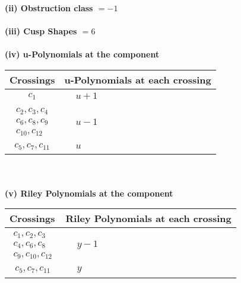 \documentclass[1p]{elsarticle_modified}
\theoremstyle{definition}
\begin{document}
\flushleft \textbf{(ii) Obstruction class $= -1$}\\~\\
\flushleft \textbf{(iii) Cusp Shapes $= 6$}\\~\\
\newpage\renewcommand{\arraystretch}{1}
\flushleft \textbf{(iv) u-Polynomials at the component}\newline \\
\begin{tabular}{m{50pt}|m{274pt}}
Crossings & \hspace{64pt}u-Polynomials at each crossing \\
\hline $$\begin{aligned}c_{1}\end{aligned}$$&$\begin{aligned}
&u+1
\end{aligned}$\\
\hline $$\begin{aligned}c_{2},c_{3},c_{4}\\c_{6},c_{8},c_{9}\\c_{10},c_{12}\end{aligned}$$&$\begin{aligned}
&u-1
\end{aligned}$\\
\hline $$\begin{aligned}c_{5},c_{7},c_{11}\end{aligned}$$&$\begin{aligned}
&u
\end{aligned}$\\
\hline
\end{tabular}\\~\\
\newpage\renewcommand{\arraystretch}{1}
\flushleft \textbf{(v) Riley Polynomials at the component}\newline \\
\begin{tabular}{m{50pt}|m{274pt}}
Crossings & \hspace{64pt}Riley Polynomials at each crossing \\
\hline $$\begin{aligned}c_{1},c_{2},c_{3}\\c_{4},c_{6},c_{8}\\c_{9},c_{10},c_{12}\end{aligned}$$&$\begin{aligned}
&y-1
\end{aligned}$\\
\hline $$\begin{aligned}c_{5},c_{7},c_{11}\end{aligned}$$&$\begin{aligned}
&y
\end{aligned}$\\
\hline
\end{tabular}\\~\\
\end{document}
